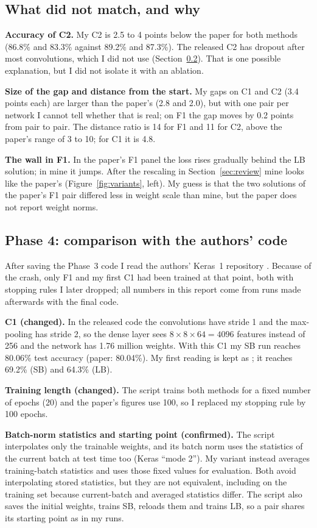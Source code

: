 \subsection{What did not match, and why}
\textbf{Accuracy of C2.} My C2 is 2.5 to 4 points below the paper for both methods (86.8\% and 83.3\% against 89.2\% and 87.3\%). The released C2 has dropout after most convolutions, which I did not use (Section~\ref{sec:phase4}). That is one possible explanation, but I did not isolate it with an ablation.

\textbf{Size of the gap and distance from the start.} My gaps on C1 and C2 (3.4 points each) are larger than the paper's (2.8 and 2.0), but with one pair per network I cannot tell whether that is real; on F1 the gap moves by 0.2 points from pair to pair. The distance ratio is 14 for F1 and 11 for C2, above the paper's range of 3 to 10; for C1 it is 4.8.

\textbf{The wall in F1.} In the paper's F1 panel the loss rises gradually behind the LB solution; in mine it jumps. After the rescaling in Section~\ref{sec:review} mine looks like the paper's (Figure~\ref{fig:variants}, left). My guess is that the two solutions of the paper's F1 pair differed less in weight scale than mine, but the paper does not report weight norms.

\subsection{Phase 4: comparison with the authors' code}\label{sec:phase4}
After saving the Phase~3 code I read the authors' Keras~1 repository . Because of the crash, only F1 and my first C1 had been trained at that point, both with stopping rules I later dropped; all numbers in this report come from runs made afterwards with the final code.

\textbf{C1 (changed).} In the released code the convolutions have stride 1 and the max-pooling has stride 2, so the dense layer sees $8\times8\times64=4096$ features instead of 256 and the network has 1.76 million weights. With this C1 my SB run reaches 80.06\% test accuracy (paper: 80.04\%). My first reading is kept as ; it reaches 69.2\% (SB) and 64.3\% (LB).

\textbf{Training length (changed).} The script trains both methods for a fixed number of epochs (20) and the paper's figures use 100, so I replaced my stopping rule by 100 epochs.

\textbf{Batch-norm statistics and starting point (confirmed).} The script interpolates only the trainable weights, and its batch norm uses the statistics of the current batch at test time too (Keras ``mode 2''). My variant instead averages training-batch statistics and uses those fixed values for evaluation. Both avoid interpolating stored statistics, but they are not equivalent, including on the training set because current-batch and averaged statistics differ. The script also saves the initial weights, trains SB, reloads them and trains LB, so a pair shares its starting point as in my runs.

